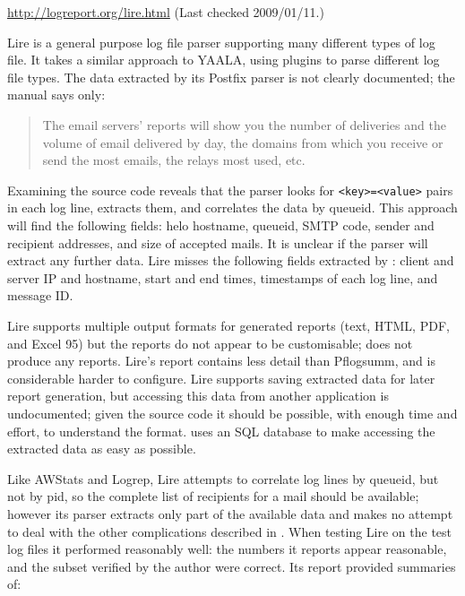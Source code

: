 \noindent{}\url{http://logreport.org/lire.html} \newline{}
(Last checked 2009/01/11.)

Lire is a general purpose log file parser supporting many different types
of log file.  It takes a similar approach to YAALA, using plugins to parse
different log file types.  The data extracted by its Postfix parser is not
clearly documented; the manual says only:

\begin{quotation}

    The email servers' reports will show you the number of deliveries and
    the volume of email delivered by day, the domains from which you
    receive or send the most emails, the relays most used, etc.

\end{quotation}

\noindent{}Examining the source code reveals that the parser looks for
\texttt{<key>=<value>} pairs in each log line, extracts them, and
correlates the data by queueid.  This approach will find the following
fields: helo hostname, queueid, \gls{SMTP} code, sender and recipient
addresses, and size of accepted mails.  It is unclear if the parser will
extract any further data.  Lire misses the following fields extracted by
\parsername{}: client and server \gls{IP} and hostname, start and end
times, timestamps of each log line, and message ID\@. 

Lire supports multiple output formats for generated reports (text, HTML,
PDF, and Excel 95) but the reports do not appear to be customisable;
\parsername{} does not produce any reports.  Lire's report contains less
detail than Pflogsumm, and is considerable harder to configure.  Lire
supports saving extracted data for later report generation, but accessing
this data from another application is undocumented; given the source code
it should be possible, with enough time and effort, to understand the
format.  \parsername{} uses an \gls{SQL} database to make accessing the
extracted data as easy as possible.  

Like AWStats and Logrep, Lire attempts to correlate log lines by queueid,
but not by \gls{pid}, so the complete list of recipients for a mail should
be available; however its parser extracts only part of the available data
and makes no attempt to deal with the other complications described in
.  When testing Lire on the \numberOFlogFILES{}
test log files it performed reasonably well: the numbers it reports appear
reasonable, and the subset verified by the author were correct.  Its report
provided summaries of: 

